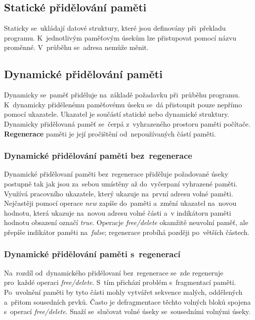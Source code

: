 \subsection{Statické přidělování paměti}

Staticky se~ukládají datové struktury, které jsou definovány při~překladu programu. K~jednotlivým paměťovým úsekům lze přistupovat pomocí názvu proměnné. V~průběhu se~adresa nemůže měnit.

\subsection{Dynamické přidělování paměti}

Dynamicky se~paměť přiděluje na~základě požadavku při~průběhu programu. K~dynamicky přidělenému paměťovému úseku se~dá přistoupit pouze nepřímo pomocí ukazatele. Ukazatel je součástí statické nebo dynamické struktury. Dynamicky přidělovaná paměť se~čerpá z~vyhrazeného prostoru paměti počítače. \textbf{Regenerace} paměti je její pročištění od~nepoužívaných částí paměti.

\subsubsection{Dynamické přidělování paměti bez~regenerace}

Dynamické přidělovaní paměti bez~regenerace přiděluje požadované úseky postupně tak jak jsou za~sebou umístěny až do~vyčerpaní vyhrazené paměti. Využívá pracovního ukazatele, který ukazuje na~první adresu volné paměti. Nejčastěji pomocí operace \emph{new} zapíše do~paměti a~změní ukazatel na~novou hodnotu, která ukazuje na~novou adresu volné části a~v indikátoru paměti hodnotu obsazení označí \emph{true}. Operacje \emph{free/delete} okamžitě neuvolní paměť, ale přepíše indikátor paměti na~\emph{false}; regenerace probíhá později po~větších částech.

\subsubsection{Dynamické přidělování paměti s~regenerací}

Na~rozdíl od~dynamického přidělovaní bez~regenerace se~zde regeneruje pro~každé operaci \emph{free/delete}. S~tím přichází problém s~fragmentací paměti. Po~uvolnění paměti by tyto části mohly vytvářet sekvence malých, oddělených a~přitom sousedních prvků. Často je defragmentace těchto volných bloků spojena s~operací \emph{free/delete}. Snaží se~slučovat volné úseky se~sousedními volnými úseky.

